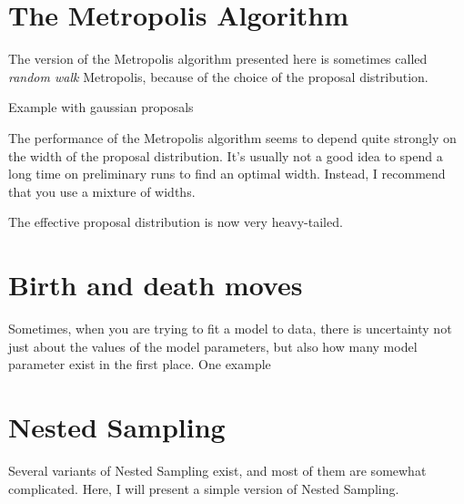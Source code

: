 \section{The Metropolis Algorithm}


The version of the Metropolis algorithm presented here is sometimes called
{\it random walk} Metropolis, because of the choice of the proposal
distribution.

Example with gaussian proposals

The performance of the Metropolis algorithm seems to depend quite strongly on
the width of the proposal distribution. It's usually not a good idea to spend
a long time on preliminary runs to find an optimal width. Instead, I recommend
that you use a mixture of widths.

The effective proposal distribution is now very heavy-tailed.



\section{Birth and death moves}
Sometimes, when you are trying to fit a model to data, there is uncertainty
not just about the values of the model parameters, but also how many model
parameter exist in the first place. One example 



\section{Nested Sampling}
Several variants of Nested Sampling exist, and most of them are somewhat
complicated. Here, I will present a simple version of Nested Sampling.



%

